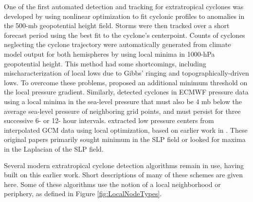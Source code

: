 \documentclass[gmdd, hvmath, online]{copernicus_discussions}
\begin{document}
One of the first automated detection and tracking for extratropical cyclones was developed by \cite{williamson1981storm} using nonlinear optimization to fit cyclonic profiles to anomalies in the 500-mb geopotential height field.  Storms were then tracked over a short forecast period using the best fit to the cyclone's centerpoint.  Counts of cyclones neglecting the cyclone trajectory were automatically generated from climate model output for both hemispheres by \cite{lambert1988cyclone} using local minima in 1000-hPa geopotential height.  This method had some shortcomings, including mischaracterization of local lows due to Gibbs' ringing and topographically-driven lows.  To overcome these problems, \cite{alpert1990climatological} proposed an additional minimum threshold on the local pressure gradient.  Similarly, \cite{le1990comparison} detected cyclones in ECMWF pressure data using a local minima in the sea-level pressure that must also be 4 mb below the average sea-level pressure of neighboring grid points, and must persist for three successive 6- or 12- hour intervals.  \cite{murray1991numerical} extracted low pressure centers from interpolated GCM data using local optimization, based on earlier work in \cite{rice1982durivation}.  These original papers primarily sought minimum in the SLP field or looked for maxima in the Laplacian of the SLP field.

Several modern extratropical cyclone detection algorithms remain in use, having built on this earlier work.  Short descriptions of many of these schemes are given here.  Some of these algorithms use the notion of a local neighborhood or periphery, as defined in Figure \ref{fig:LocalNodeTypes}.
\end{document}
